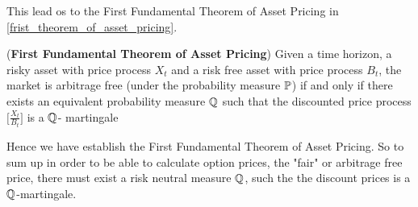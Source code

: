 \noindent 
This lead os to the First Fundamental Theorem of Asset Pricing in \autoref{frist_theorem_of_asset_pricing}.
\begin{theorem}
    (\textbf{First Fundamental Theorem of Asset Pricing})
    Given a time horizon, a risky asset with price process $X_t$ and a
    risk free asset with price process $B_t$, the market is arbitrage free 
    (under the probability measure $\mathbb{P}$) if and only if there exists an 
    equivalent probability measure $\mathbb{Q}$ such that the discounted price process
    $\Big[\frac{X_t}{B_t}\Big]$  is a $\mathbb{Q}$- martingale \cite{Bjork}
    \label{frist_theorem_of_asset_pricing}
\end{theorem}
\noindent 
Hence we have establish the First Fundamental Theorem of Asset Pricing. So to sum up in order to be able to calculate
option prices, the "fair" or arbitrage free price, there must exist a risk neutral measure $\mathbb{Q}$, such the the discount prices
is a $\mathbb{Q}$-martingale. 
